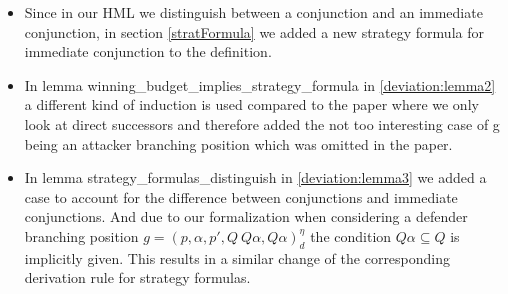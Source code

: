 \begin{itemize}
    \item Since in our HML we distinguish between a conjunction and an immediate conjunction, in section \ref{stratFormula} 
    we added a new strategy formula for immediate conjunction to the definition.
    \item In lemma winning\_budget\_implies\_strategy\_formula in \ref{deviation:lemma2} a different kind of induction is used compared to the paper 
    where we only look at direct successors and therefore added the not too interesting case of g being an 
    attacker branching position which was omitted in the paper.
    \item In lemma strategy\_formulas\_distinguish in  \ref{deviation:lemma3} we added a case to account for the difference between 
    conjunctions and immediate conjunctions. And due to our formalization when considering a
    defender branching position $g=(p,\alpha ,p', Q \ Q\alpha, Q\alpha)_d^\eta$ the condition 
    $Q \alpha \subseteq Q$ is implicitly given.
    This results in a similar change of the corresponding derivation rule for strategy formulas.
\end{itemize}

